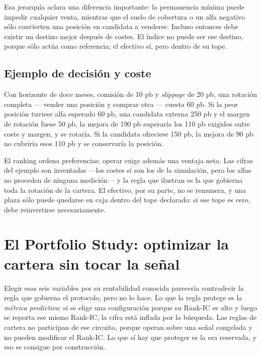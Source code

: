 Esa jerarquía aclara una diferencia importante: la permanencia mínima puede impedir cualquier venta,
mientras que el suelo de cobertura o un alfa negativo sólo convierten una posición en candidata a
venderse. Incluso entonces debe existir un destino mejor después de costes. El índice no puede ser
ese destino, porque sólo actúa como referencia; el efectivo sí, pero dentro de su tope.

\subsection{Ejemplo de decisión y coste}

\begin{ejemplo}
Con horizonte de doce meses, comisión de 10 pb y \textit{slippage} de 20 pb, una rotación completa
--- vender una posición y comprar otra --- cuesta 60 pb. Si la peor posición tuviese alfa esperado
60 pb, una candidata externa 250 pb y el margen de rotación fuese 50 pb, la mejora de 190 pb
superaría los 110 pb exigidos entre coste y margen, y se rotaría. Si la candidata ofreciese 150 pb,
la mejora de 90 pb no cubriría esos 110 pb y se conservaría la posición.
\end{ejemplo}

El ranking ordena preferencias; operar exige además una ventaja neta. Las cifras del ejemplo son
inventadas ---los costes sí son los de la simulación, pero los alfas no proceden de ninguna
medición--- y la regla que ilustran es la que gobierna toda la rotación de la cartera. El efectivo,
por su parte, no se remunera, y una plaza sólo puede quedarse en caja dentro del tope declarado: si
ese tope es cero, debe reinvertirse necesariamente.

\section{El Portfolio Study: optimizar la cartera sin tocar la señal}
\label{sec:portfolio-study}

Elegir esas seis variables por su rentabilidad conocida parecería contradecir la regla que gobierna
el protocolo, pero no lo hace. Lo que la regla protege es la \emph{métrica predictiva}: si se elige
una configuración porque su Rank-IC es alto y luego se reporta ese mismo Rank-IC, la cifra está
inflada por la búsqueda. Las reglas de cartera no participan de ese circuito, porque operan sobre
una señal congelada y no pueden modificar el Rank-IC. Lo que sí hay que proteger es la era
reservada, y eso se consigue por construcción.

